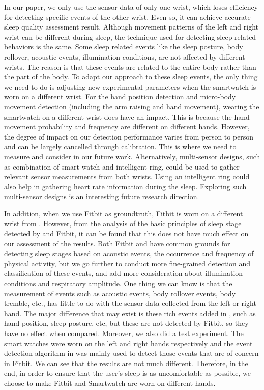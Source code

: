  In our paper, we only use the sensor data of only one wrist, which loses efficiency for detecting specific events of the other wrist. Even
 so, it can achieve accurate sleep quality assessment result. Although movement patterns of the left and right wrist can be different
 during sleep, the technique used for detecting sleep related behaviors is the same. Some sleep related events like the sleep posture, body
 rollover, acoustic events, illumination 	conditions, are not affected by different wrists. The reason is that these events are related
 to the entire body rather than the part 	of the body. To adapt our approach to these sleep events, the only thing we need to do is
 adjusting new experimental parameters when the smartwatch is worn on a different wrist. For the hand position detection and micro-body
 movement detection (including the arm 	raising and hand movement), wearing the smartwatch on a different wrist does have an impact. This
 is because the hand movement 	probability and frequency are different on different hands. However, the degree of impact on our detection
 performance varies from 	person to person and can be largely cancelled through calibration. This is where we need to measure and
 consider in our future work. Alternatively, multi-sensor designs, such as combination of smart watch and intelligent ring, could be used
 to gather relevant sensor measurements from both wrists. Using an intelligent ring could also help in gathering heart rate information
 during the sleep. Exploring such multi-sensor designs is an interesting future research direction.

 In addition, when we use Fitbit as groundtruth, Fitbit is worn on a different
      wrist from {\systemname}. However, from the analysis of the basic principles of sleep stage detected by {\systemname} and Fitbit,
      it can be found that this does not have much effect on our assessment of the results. Both Fitbit and {\systemname} have common
      grounds for detecting sleep stages based on acoustic events, the occurrence and frequency of physical activity, but we go further
      to conduct more fine-grained detection and classification of these events, and add more consideration about illumination conditions
      and respiratory amplitude. One thing we can know is that the measurement of events such as acoustic events, body rollover events,
      body tremble, etc., has little to do with the sensor data collected from the left or right hand. The major difference that may
      exist is these rich events added in {\systemname}, such as hand position, sleep posture, etc,  but these are not detected by
      Fitbit, so they have no effect when compared. Moreover, we also did a test experiment. The smart watches were worn on the left and
      right hands respectively and the event detection algorithm in {\systemname} was mainly used to detect those events that are of
      concern in Fitbit. We can see that the results are not much different. Therefore, in the end, in order to ensure that the user's
      sleep is as uncomfortable as possible, we choose to make Fitbit and Smartwatch are worn on different hands.

